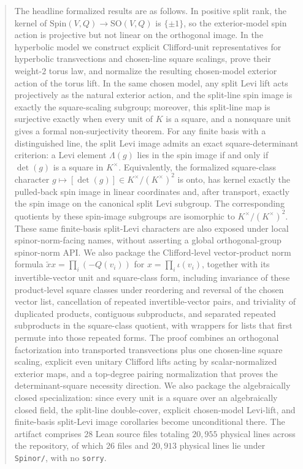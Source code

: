 \documentclass[11pt,a4paper]{article}
\theoremstyle{plain}
\theoremstyle{definition}
\theoremstyle{remark}
\newcommand{\Spin}{\mathrm{Spin}}
\newcommand{\SO}{\mathrm{SO}}
\DeclareRobustCommand{\code}[1]{\ifmmode\text{\nolinkurl{#1}}\else\nolinkurl{#1}\fi}
\begin{document}
\begin{abstract}
The headline formalized results are as follows. In positive split rank, the
kernel of $\Spin(V,Q)\to\SO(V,Q)$ is $\{\pm1\}$, so the exterior-model spin
action is projective but not linear on the orthogonal image. In the hyperbolic
model we construct explicit Clifford-unit representatives for hyperbolic
transvections and chosen-line square scalings, prove their weight-$2$ torus
law, and normalize the resulting chosen-model exterior action of the torus
lift. In the same chosen model, any split Levi lift acts projectively as the
natural exterior action, and the split-line spin image is exactly the
square-scaling subgroup; moreover, this split-line map is surjective exactly
when every unit of $K$ is a square, and a nonsquare unit gives a formal
non-surjectivity theorem. For any finite basis with a distinguished line, the
split Levi image admits an exact square-determinant criterion: a Levi element
$\Lambda(g)$ lies in the spin image if and only if $\det(g)$ is a square in
$K^\times$. Equivalently, the formalized square-class character
$g\mapsto[\det(g)]\in K^\times/(K^\times)^2$ is onto, has kernel exactly the
pulled-back spin image in linear coordinates and, after transport, exactly the spin image on the
canonical split Levi subgroup. The corresponding quotients by these spin-image subgroups are
isomorphic to \(K^\times/(K^\times)^2\). These same finite-basis split-Levi
characters are also exposed under local spinor-norm-facing names, without
asserting a global orthogonal-group spinor-norm API. We also package the
Clifford-level vector-product norm formula
\(\widetilde{x}x=\prod_i(-Q(v_i))\) for \(x=\prod_i\iota(v_i)\), together with
its invertible-vector unit and square-class form, including invariance of these
product-level square classes under reordering and reversal of the chosen vector
list, cancellation of repeated invertible-vector pairs, and triviality of
duplicated products, contiguous subproducts, and separated repeated subproducts
in the square-class quotient, with wrappers for lists that first permute into
those repeated forms. The proof combines an
orthogonal factorization into transported
transvections plus one chosen-line square scaling, explicit even unitary
Clifford lifts acting by scalar-normalized exterior maps, and a top-degree
pairing normalization that proves the determinant-square necessity direction.
We also package the algebraically closed specialization: since every unit is a
square over an algebraically closed field, the split-line double-cover,
explicit chosen-model Levi-lift, and finite-basis split-Levi image corollaries
become unconditional there.
The artifact comprises
$28$ Lean source files totaling
$20{,}955$ physical lines across the repository, of which $26$ files and
$20{,}913$ physical lines lie under \code{Spinor/}, with no \texttt{sorry}.
\end{abstract}
\end{document}
